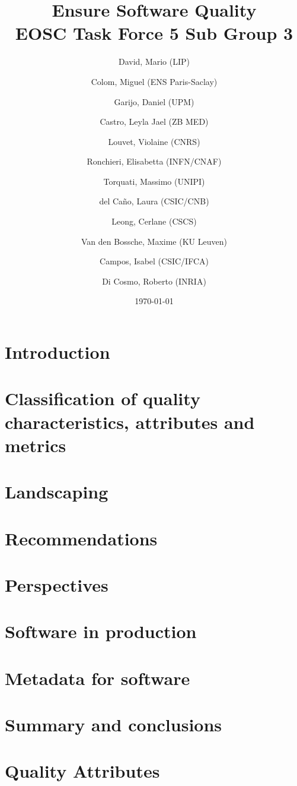 \documentclass[a4paper]{article}
\title{Ensure Software Quality \\
    \large EOSC Task Force 5 Sub Group 3}
\author{
    David, Mario (LIP) \orcidlink{0000-0003-1802-5356} \and
    Colom, Miguel (ENS Paris-Saclay) \orcidlink{0000-0003-2636-0656} \and
    Garijo, Daniel (UPM) \orcidlink{0000-0003-0454-7145} \and
    Castro, Leyla Jael (ZB MED) \orcidlink{0000-0003-3986-0510} \and
    Louvet, Violaine (CNRS) \orcidlink{0000-0002-8742-8952} \and
    Ronchieri, Elisabetta (INFN/CNAF) \orcidlink{0000-0002-7341-6491} \and
    Torquati, Massimo (UNIPI) \orcidlink{0000-0001-6323-3459} \and
    del Ca\~{n}o, Laura (CSIC/CNB) \orcidlink{0000-0003-0981-2040} \and
    Leong, Cerlane (CSCS)  \orcidlink{0000-0001-8241-6277} \and
    Van den Bossche, Maxime (KU Leuven) \orcidlink{0000-0002-0938-0156} \and
    Campos, Isabel (CSIC/IFCA) \orcidlink{0000-0002-9350-0383} \and
    Di Cosmo, Roberto (INRIA) \orcidlink{0000-0002-7493-5349}
}
\date{\today}
\begin{document}
\maketitle

\tableofcontents

\newpage
\section{Introduction}
\label{sec:introduction}

\newpage

\section{Classification of quality characteristics, attributes and metrics}
\label{sec:classification}

\newpage

\section{Landscaping}
\label{sec:landscaping}

\newpage

\section{Recommendations}
\label{sec:recommendations}

\newpage

\section{Perspectives}
\label{sec:perspectives}

\newpage

\section{Software in production}
\label{sec:sw_in_prod}

\newpage

\section{Metadata for software}
\label{sec:metadata}

\newpage

\section{Summary and conclusions}
\label{sec:summary}

\newpage

\appendix
\section{Quality Attributes}
\label{appendix_qa}


\newpage
\printbibliography
\end{document}
